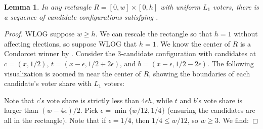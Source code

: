 \documentclass{article}
\theoremstyle{theorem}
\newtheorem{lemma}{Lemma}
\theoremstyle{definition}
\begin{document}
\begin{lemma}\label{lemma:rect-minimal-l1}
  In any rectangle $R = [0, w] \times [0, h]$ with uniform $L_1$ voters, there is a sequence of candidate configurations satisfying .
\end{lemma}
\begin{proof}
WLOG suppose $w \ge h$. We can rescale the rectangle so that $h = 1$ without affecting elections, so suppose WLOG that $h = 1$. We know the center of $R$ is a Condorcet winner by . Consider the 3-candidate configuration with candidates at $c = (x, 1/2)$, $t = (x - \epsilon, 1/2 + 2\epsilon)$, and  $b = (x - \epsilon, 1/2 - 2\epsilon)$. The following visualization is zoomed in near the center of $R$, showing the boundaries of each candidate's voter share with $L_1$ voters:
 \begin{center}
  \end{center}
  
  Note that $c$'s vote share is strictly less than $4 \epsilon h$, while $t$ and $b$'s vote share is larger than $(w - 4\epsilon)/2$. Pick $\epsilon = \min\{w / 12, 1 / 4\}$ (ensuring the candidates are all in the rectangle). Note that if $\epsilon = 1 / 4$, then $1 / 4 \le w / 12$, so $ w \ge 3$.   We find:
  

\end{proof}
\end{document}

